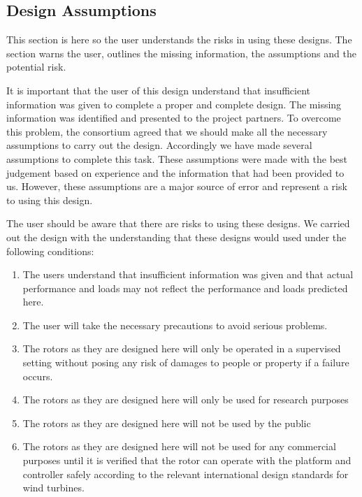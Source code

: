 \subsection{Design Assumptions}
\label{subsec:assumptions}

This section is here so the user understands the risks in using these designs. The section warns the user, outlines the missing information, the assumptions and the potential risk.

It is important that the user of this design understand that insufficient information was given to complete a proper and complete design. The missing information was identified and presented to the project partners. To overcome this problem, the consortium agreed that we should make all the necessary assumptions to carry out the design. Accordingly we have made several assumptions to complete this task. These assumptions were made with the best judgement based on experience and the information that had been provided to us. However, these assumptions are a major source of error and represent a risk to using this design.

The user should be aware that there are risks to using these designs. We carried out the design with the understanding that these designs would used under the following conditions:

\begin{enumerate}
	\item The users understand that insufficient information was given and that actual performance and loads may not reflect the performance and loads predicted here.
	\item The user will take the necessary precautions to avoid serious problems.
	\item The rotors as they are designed here will only be operated in a supervised setting without posing any risk of damages to people or property if a failure occurs.
	\item The rotors as they are designed here will only be used for research purposes
	\item The rotors as they are designed here will not be used by the public
	\item The rotors as they are designed here will not be used for any commercial purposes until it is verified that the rotor can operate with the platform and controller safely according to the relevant international design standards for wind turbines.
\end{enumerate}

